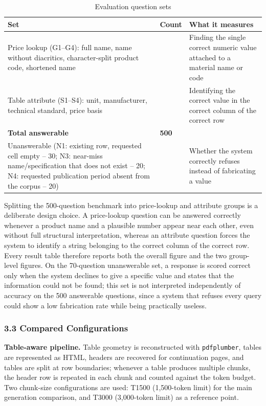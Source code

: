 \documentclass[11pt,a4paper]{article}
\begin{document}
\begin{table}[htbp]
\centering
\caption{Evaluation question sets}
\label{tab:rag-question-sets}
\small
\renewcommand{\arraystretch}{1.25}
\begin{tabularx}{\textwidth}{|X|>{\centering\arraybackslash}p{}|X|}
\hline
\rowcolor{tableheader}
\textbf{Set} & \textbf{Count} & \textbf{What it measures} \\
\hline
Price lookup (G1--G4): full name, name without diacritics, character-split
product code, shortened name & 252 &
Finding the single correct numeric value attached to a material name or code \\
\hline
Table attribute (S1--S4): unit, manufacturer, technical standard, price basis
& 248 &
Identifying the correct value in the correct column of the correct row \\
\hline
\textbf{Total answerable} & \textbf{500} & \\
\hline
Unanswerable (N1: existing row, requested cell empty -- 30; N3: near-miss
name/specification that does not exist -- 20; N4: requested publication
period absent from the corpus -- 20) & 70 &
Whether the system correctly refuses instead of fabricating a value \\
\hline
\end{tabularx}
\end{table}
\FloatBarrier

Splitting the 500-question benchmark into price-lookup and attribute groups
is a deliberate design choice. A price-lookup question can be answered
correctly whenever a product name and a plausible number appear near each
other, even without full structural interpretation, whereas an attribute
question forces the system to identify a string belonging to the correct
column of the correct row. Every result table therefore reports both the
overall figure and the two group-level figures. On the 70-question
unanswerable set, a response is scored correct only when the system declines
to give a specific value and states that the information could not be found;
this set is not interpreted independently of accuracy on the 500 answerable
questions, since a system that refuses every query could show a low
fabrication rate while being practically useless.

\subsubsection{3.3 Compared Configurations}

\textbf{Table-aware pipeline.} Table geometry is reconstructed with
\texttt{pdfplumber}, tables are represented as HTML, headers are recovered
for continuation pages, and tables are split at row boundaries; whenever a
table produces multiple chunks, the header row is repeated in each chunk and
counted against the token budget. Two chunk-size configurations are used:
T1500 (1,500-token limit) for the main generation comparison, and T3000
(3,000-token limit) as a reference point.
\end{document}
